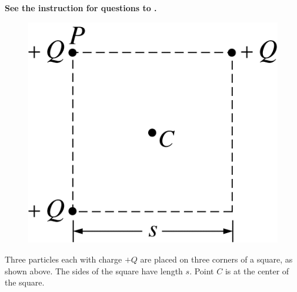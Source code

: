 \textbf{See the instruction for questions  to .}

\begin{figure}[H]
\centering
\includegraphics[scale=0.25]{images/img-002-002.png}
\end{figure}

Three particles each with charge $+Q$ are placed on three corners of a square, as shown above. The sides of the square have length $s$. Point $C$ is at the center of the square.

